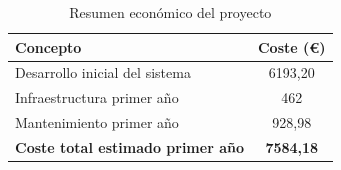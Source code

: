 \begin{table}[H]
\centering
\caption{Resumen económico del proyecto}
\label{tabla_coste_total}
\begin{tabular}{|p{8cm}|c|}
\hline
\textbf{Concepto} & \textbf{Coste (€)} \\ \hline

Desarrollo inicial del sistema & 6193,20 \\ \hline

Infraestructura primer año & 462 \\ \hline

Mantenimiento primer año & 928,98 \\ \hline

\textbf{Coste total estimado primer año} & \textbf{7584,18} \\ \hline

\end{tabular}
\end{table}